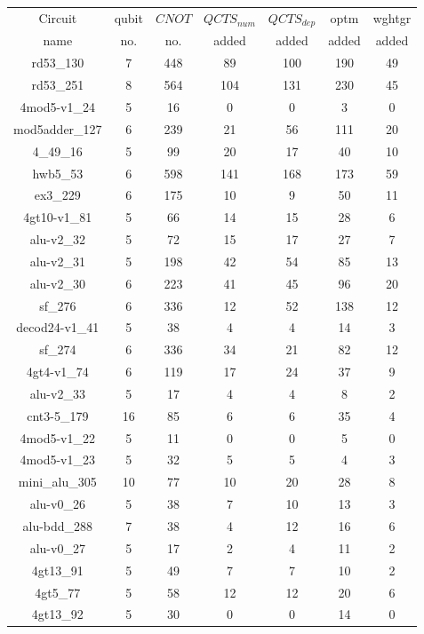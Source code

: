 \documentclass[runningheads]{llncs}
\begin{document}
	\begin{table}[H]
		\begin{center}  
		\begin{tabular}{|c|c|c|c|c|c|c|}
		\hline
		Circuit &  qubit  & $CNOT$ &$QCTS_{num}$& $QCTS_{dep}$  & optm 	 & wghtgr 	\\
		 name	&   no. 	&	no. & added&  added &  added 	&  added\\
		\hline
		rd53\_130 & 7 & 448 & 89 & 100 & 190 & 49 \\ 
rd53\_251 & 8 & 564 & 104 & 131 & 230 & 45 \\ 
4mod5-v1\_24 & 5 & 16 & 0 & 0 & 3 & 0 \\ 
mod5adder\_127 & 6 & 239 & 21 & 56 & 111 & 20 \\ 
4\_49\_16 & 5 & 99 & 20 & 17 & 40 & 10 \\ 
hwb5\_53 & 6 & 598 & 141 & 168 & 173 & 59 \\ 
ex3\_229 & 6 & 175 & 10 & 9 & 50 & 11 \\ 
4gt10-v1\_81 & 5 & 66 & 14 & 15 & 28 & 6 \\ 
alu-v2\_32 & 5 & 72 & 15 & 17 & 27 & 7 \\ 
alu-v2\_31 & 5 & 198 & 42 & 54 & 85 & 13 \\ 
alu-v2\_30 & 6 & 223 & 41 & 45 & 96 & 20 \\ 
sf\_276 & 6 & 336 & 12 & 52 & 138 & 12 \\ 
decod24-v1\_41 & 5 & 38 & 4 & 4 & 14 & 3 \\ 
sf\_274 & 6 & 336 & 34 & 21 & 82 & 12 \\ 
4gt4-v1\_74 & 6 & 119 & 17 & 24 & 37 & 9 \\ 
alu-v2\_33 & 5 & 17 & 4 & 4 & 8 & 2 \\ 
cnt3-5\_179 & 16 & 85 & 6 & 6 & 35 & 4 \\ 
4mod5-v1\_22 & 5 & 11 & 0 & 0 & 5 & 0 \\ 
4mod5-v1\_23 & 5 & 32 & 5 & 5 & 4 & 3 \\ 
mini\_alu\_305 & 10 & 77 & 10 & 20 & 28 & 8 \\ 
alu-v0\_26 & 5 & 38 & 7 & 10 & 13 & 3 \\ 
alu-bdd\_288 & 7 & 38 & 4 & 12 & 16 & 6 \\ 
alu-v0\_27 & 5 & 17 & 2 & 4 & 11 & 2 \\ 
4gt13\_91 & 5 & 49 & 7 & 7 & 10 & 2 \\ 
4gt5\_77 & 5 & 58 & 12 & 12 & 20 & 6 \\ 
4gt13\_92 & 5 & 30 & 0 & 0 & 14 & 0 \\ 

\end{tabular}
\end{center}
\end{table}
\end{document}
